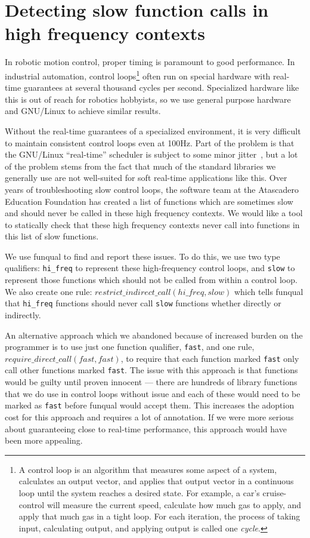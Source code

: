 \section{Detecting slow function calls in high frequency contexts}\label{sec:app:blocking}

In robotic motion control, proper timing is paramount to good performance.  In industrial automation, control loops\footnote{A control loop is an algorithm that measures some aspect of a system, calculates an output vector, and applies that output vector in a continuous loop until the system reaches a desired state.  For example, a car's cruise-control will measure the current speed, calculate how much gas to apply, and apply that much gas in a tight loop.  For each iteration, the process of taking input, calculating output, and applying output is called one \textit{cycle}.} often run on special hardware with real-time guarantees at several thousand cycles per second.  Specialized hardware like this is out of reach for robotics hobbyists, so we use general purpose hardware and GNU/Linux to achieve similar results. 

Without the real-time guarantees of a specialized environment, it is very difficult to maintain consistent control loops even at 100Hz.  Part of the problem is that the GNU/Linux ``real-time'' scheduler is subject to some minor jitter~\cite{rt-jitter}, but a lot of the problem stems from the fact that much of the standard libraries we generally use are not well-suited for soft real-time applications like this.  Over years of troubleshooting slow control loops, the software team at the Atascadero Education Foundation has created a list of functions which are sometimes slow and should never be called in these high frequency contexts.  We would like a tool to statically check that these high frequency contexts never call into functions in this list of slow functions.  

We use funqual to find and report these issues.  To do this, we use two type qualifiers: \lstinline{hi_freq} to represent these high-frequency control loops, and \lstinline{slow} to represent those functions which should not be called from within a control loop.  We also create one rule: $restrict\_indirect\_call(hi\_freq, slow)$ which tells funqual that \lstinline{hi_freq} functions should never call \lstinline{slow} functions whether directly or indirectly. 

An alternative approach which we abandoned because of increased burden on the programmer is to use just one function qualifier, \lstinline{fast}, and one rule, $require\_direct\_call(\allowbreak fast, fast)$, to require that each function marked \lstinline{fast} only call other functions marked \lstinline{fast}.  The issue with this approach is that  functions would be guilty until proven innocent --- there are hundreds of library functions that we do use in control loops without issue and each of these would need to be marked as \lstinline{fast} before funqual would accept them.  This increases the adoption cost for this approach and requires a lot of annotation. If we were more serious about guaranteeing close to real-time performance, this approach would have been more appealing.  

